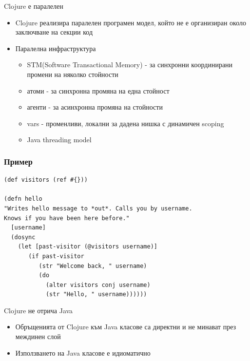 \documentclass[compress,red]{beamer}
\begin{document}
\begin{frame}{Clojure е паралелен}
  \transdissolve
  \begin{itemize}
  \item Clojure реализира паралелен програмен модел, който не е
    организиран около заключване на секции код
  \item Паралелна инфраструктура
    \begin{itemize}
      \item STM(Software Transactional Memory) - за синхронни координирани
        промени на няколко стойности
      \item атоми - за синхронна промяна на една стойност
      \item агенти - за асинхронна промяна на стойности
      \item vars - променливи, локални за дадена нишка с динамичен
        scoping
      \item Java threading model
    \end{itemize}
  \end{itemize}
\end{frame}

\begin{frame}[fragile]
  \frametitle{Пример}
  \transdissolve
\begin{lstlisting}
(def visitors (ref #{}))

(defn hello
"Writes hello message to *out*. Calls you by username.
Knows if you have been here before."
  [username]
  (dosync
    (let [past-visitor (@visitors username)]
       (if past-visitor
          (str "Welcome back, " username)
          (do
            (alter visitors conj username)
            (str "Hello, " username))))))
\end{lstlisting}
\end{frame}

\begin{frame}{Clojure не отрича Java}
  \transdissolve
  \begin{itemize}
  \item Обръщенията от Clojure към Java класове са директни и не
    минават през междинен слой
  \item Използването на Java класове е идиоматично
  \end{itemize}
\end{frame}
\end{document}
